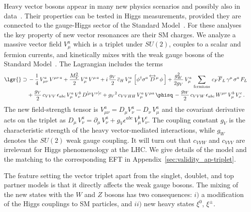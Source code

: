 Heavy vector bosons appear in many new physics scenarios and possibly
also in data~\cite{ww_resonance}. Their properties can be tested in
Higgs measurements, provided they are connected to the gauge-Higgs
sector of the Standard
Model~\cite{Low:2009di,Biekoetter:2014jwa,Pappadopulo:2014qza}.  For
these analyses the key property of new vector resonances are their SM
charges.  We analyze a massive vector field $V^a_\mu$ which is a
triplet under $SU(2)$, couples to a scalar and fermion currents, and
kinetically mixes with the weak gauge bosons of the Standard
Model~\cite{Pappadopulo:2014qza,Biekoetter:2014jwa}. The Lagrangian
includes the terms
%
\begin{alignat}{5} \lgr{} \supset& \, -
\dfrac{1}{4}\,V_{\mu\nu}^a\,V^{\mu\nu\, a} +
\dfrac{M_V^2}{2}\,V_\mu^a\,V^{\mu\,a} + i\,\frac{{g_V}}{2}
\,{\overline{c}_{H}}\,{V_{\mu}^a}\,\left[\phi^\dagger \sigma^a
\,\overleftrightarrow{D}^\mu\,\phi\,\right] +\dfrac{g_W^2}{2
{g_V}}\,{V_{\mu}^a}\,\sum_\text{fermions}\, {c_F}
\overline{F}_L\,\gamma^\mu\, \sigma^a \,F_L \notag \\
 &+
\dfrac{{g_V}}{2}\,{c_{VVV}}\,\epsilon_{abc}\,V_\mu^a\,V_\nu^b\,D^{[\mu}V^{\nu]c}
+ {g_V}^2\,{c_{VVHH}}\,{V_{\mu}^a}\,V^{\mu a}\,\phisq\, -
\dfrac{g_W}{2}\,{c_{VVW}}\,\epsilon_{abc}\,W^{\mu\nu}\,V_\mu^b\,V_\nu^c
\,.
 \label{eq:lag-vectortriplet}
\end{alignat}
%
The new field-strength tensor is $V_{\mu\nu}^a = D_\mu{V_{\nu}^a} -
D_\nu\,{V_{\mu}^a}$ and the covariant derivative acts on the triplet
as $D_\mu\,V_\nu^a = \partial_\mu\,V_\nu^a+{g_V}
\epsilon^{abc}\,V^b_\mu V_\nu^c$.  The coupling constant ${g_V}$ is
the characteristic strength of the heavy vector-mediated interactions,
while $g_W$ denotes the $SU(2)$ weak gauge coupling.  It will turn out
that $c_{VVW}$ and $c_{VVV}$ are irrelevant for Higgs phenomenology at
the LHC.  We give details of the model and the matching to the
corresponding EFT in Appendix~\ref{sec:validity_ap-triplet}.\medskip

The feature setting the vector triplet apart from the singlet,
doublet, and top partner models is that it directly affects the weak
gauge bosons.  The mixing of the new states with the $W$ and $Z$
bosons has two consequences: $i)$ a modification of the Higgs
couplings to SM particles, and $ii)$ new heavy states $\xi^0$,
$\xi^\pm$.

